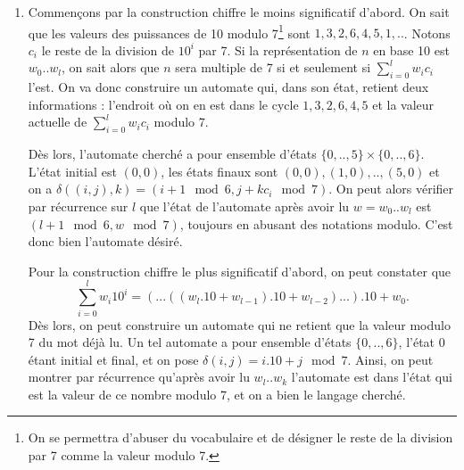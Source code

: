 \begin{sol}
\begin{enumerate}
\item Commençons par la construction chiffre le moins significatif d'abord. On sait que les valeurs des puissances de 10 modulo 7\footnote{On se permettra d'abuser du vocabulaire et de désigner le reste de la division par 7 comme la valeur modulo 7.} sont $1,3,2,6,4,5,1,..$. Notons $c_i$ le reste de la division de $10^i$ par 7. Si la représentation de $n$ en base 10 est $w_0..w_l$, on sait alors que $n$ sera multiple de 7 si et seulement si $\sum_{i=0}^l w_ic_i$ l'est. On va donc construire un automate qui, dans son état, retient deux informations : l'endroit où on en est dans le cycle $1,3,2,6,4,5$ et la valeur actuelle de $\sum_{i=0}^l w_ic_i$ modulo 7.

Dès lors, l'automate cherché a pour ensemble d'états $\{0,..,5\}\times\{0,..,6\}$. L'état initial est $(0,0)$, les états finaux sont $(0,0),(1,0),..,(5,0)$ et on a $\delta((i,j),k)=(i+1 \mod 6, j+kc_i \mod 7)$. On peut alors vérifier par récurrence sur $l$ que l'état de l'automate après avoir lu $w=w_0..w_l$ est $(l+1\mod 6, w\mod 7)$, toujours en abusant des notations modulo. C'est donc bien l'automate désiré.

Pour la construction chiffre le plus significatif d'abord, on peut constater que
\[\sum_{i=0}^l w_i10^i= (...((w_l.10+w_{l-1}).10+w_{l-2})...).10+w_0.\]
Dès lors, on peut construire un automate qui ne retient que la valeur modulo 7 du mot déjà lu. Un tel automate a pour ensemble d'états $\{0,..,6\}$, l'état $0$ étant initial et final, et on pose $\delta(i,j)=i.10+j \mod 7$. Ainsi, on peut montrer par récurrence qu'après avoir lu $w_l..w_k$ l'automate est dans l'état qui est la valeur de ce nombre modulo 7, et on a bien le langage cherché.
\end{enumerate}
\end{sol}

